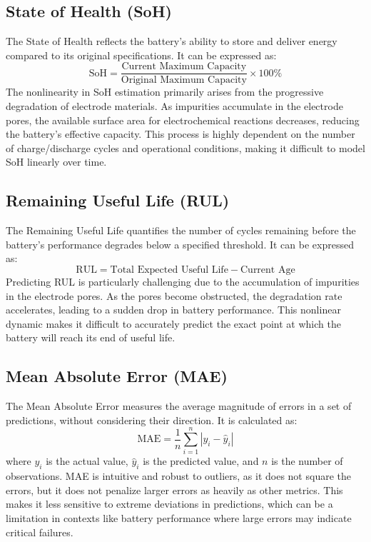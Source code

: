 \subsection{State of Health (SoH)}
The State of Health reflects the battery's ability to store and deliver energy compared to its original specifications. It can be expressed as:
\begin{equation}
\text{SoH} = \frac{\text{Current Maximum Capacity}}{\text{Original Maximum Capacity}} \times 100\%
\end{equation}
The nonlinearity in SoH estimation primarily arises from the progressive degradation of electrode materials. As impurities accumulate in the electrode pores, the available surface area for electrochemical reactions decreases, reducing the battery's effective capacity. This process is highly dependent on the number of charge/discharge cycles and operational conditions, making it difficult to model SoH linearly over time.

\subsection{Remaining Useful Life (RUL)}
The Remaining Useful Life quantifies the number of cycles remaining before the battery's performance degrades below a specified threshold. It can be expressed as:
\begin{equation}
\text{RUL} = \text{Total Expected Useful Life} - \text{Current Age}
\end{equation}
Predicting RUL is particularly challenging due to the accumulation of impurities in the electrode pores. As the pores become obstructed, the degradation rate accelerates, leading to a sudden drop in battery performance. This nonlinear dynamic makes it difficult to accurately predict the exact point at which the battery will reach its end of useful life.
\subsection{Mean Absolute Error (MAE)}
The Mean Absolute Error measures the average magnitude of errors in a set of predictions, without considering their direction. It is calculated as:
\begin{equation}
\text{MAE} = \frac{1}{n} \sum_{i=1}^{n} |y_i - \hat{y}_i|
\end{equation}
where $y_i$ is the actual value, $\hat{y}_i$ is the predicted value, and $n$ is the number of observations. MAE is intuitive and robust to outliers, as it does not square the errors, but it does not penalize larger errors as heavily as other metrics. This makes it less sensitive to extreme deviations in predictions, which can be a limitation in contexts like battery performance where large errors may indicate critical failures.

